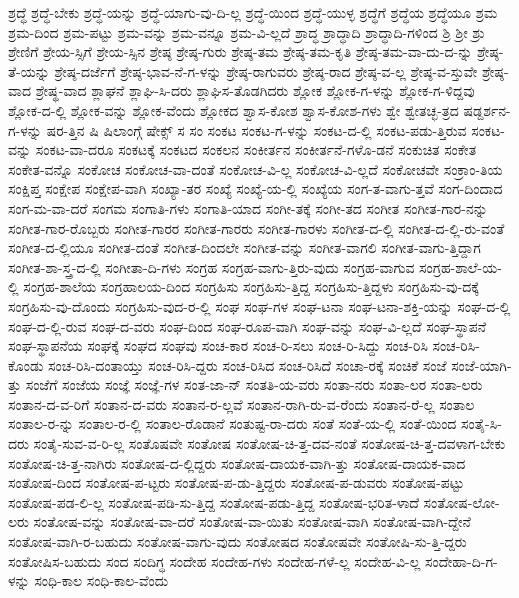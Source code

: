 {ಶ್ರದ್ಧೆ
ಶ್ರದ್ಧೆ-ಬೇಕು
ಶ್ರದ್ಧೆ-ಯನ್ನು
ಶ್ರದ್ಧೆ-ಯಾಗು-ವು-ದಿ-ಲ್ಲ
ಶ್ರದ್ಧೆ-ಯಿಂದ
ಶ್ರದ್ಧೆ-ಯುಳ್ಳ
ಶ್ರದ್ಧೆಗೆ
ಶ್ರದ್ಧೆಯ
ಶ್ರದ್ಧೆಯೂ
ಶ್ರಮ
ಶ್ರಮ-ದಿಂದ
ಶ್ರಮ-ಪಟ್ಟು
ಶ್ರಮ-ವನ್ನು
ಶ್ರಮ-ವನ್ನೂ
ಶ್ರಮ-ವಿ-ಲ್ಲದೆ
ಶ್ರಾದ್ಧ
ಶ್ರಾದ್ಧಾದಿ
ಶ್ರಾದ್ಧಾದಿ-ಗಳಿಂದ
ಶ್ರಿ
ಶ್ರೀ
ಶ್ರು
ಶ್ರೇಣಿಗೆ
ಶ್ರೇಯ-ಸ್ಸಿಗೆ
ಶ್ರೇಯ-ಸ್ಸಿನ
ಶ್ರೇಷ್ಠ
ಶ್ರೇಷ್ಠ-ಗುರು
ಶ್ರೇಷ್ಠ-ತಮ
ಶ್ರೇಷ್ಠ-ತಮ-ಕೃತಿ
ಶ್ರೇಷ್ಠ-ತಮ-ವಾ-ದು-ದ-ನ್ನು
ಶ್ರೇಷ್ಠ-ತೆ-ಯನ್ನು
ಶ್ರೇಷ್ಠ-ದರ್ಜೆಗೆ
ಶ್ರೇಷ್ಠ-ಭಾವ-ನೆ-ಗ-ಳನ್ನು
ಶ್ರೇಷ್ಠ-ರಾಗುವರು
ಶ್ರೇಷ್ಠ-ರಾದ
ಶ್ರೇಷ್ಠ-ವ-ಲ್ಲ
ಶ್ರೇಷ್ಠ-ವ-ಸ್ತುವೇ
ಶ್ರೇಷ್ಠ-ವಾದ
ಶ್ರೇಷ್ಥ-ವಾದ
ಶ್ಲಾಘನೆ
ಶ್ಲಾಘಿ-ಸಿ-ದರು
ಶ್ಲಾಘಿಸ-ತೊಡಗಿದರು
ಶ್ಲೋಕ
ಶ್ಲೋಕ-ಗ-ಳನ್ನು
ಶ್ಲೋಕ-ಗ-ಳಿದ್ದವು
ಶ್ಲೋಕ-ದ-ಲ್ಲಿ
ಶ್ಲೋಕ-ವನ್ನು
ಶ್ಲೋಕ-ವೆಂದು
ಶ್ಲೋಕದ
ಶ್ವಾಸ-ಕೋಶ
ಶ್ವಾಸ-ಕೋಶ-ಗಳು
ಶ್ವೇ
ಶ್ವೇತಚ್ಛ-ತ್ರದ
ಷಡ್ದರ್ಶನ-ಗ-ಳನ್ನು
ಷರ-ತ್ತಿನ
ಷಿ
ಷಿಲಾಂಗ್ಗೆ
ಷೇಕ್ಸ್
ಸ
ಸಂ
ಸಂಕಟ
ಸಂಕಟ-ಗ-ಳನ್ನು
ಸಂಕಟ-ದ-ಲ್ಲಿ
ಸಂಕಟ-ಪಡು-ತ್ತಿರುವ
ಸಂಕಟ-ವನ್ನು
ಸಂಕಟ-ವಾ-ದರೂ
ಸಂಕಟಕ್ಕೆ
ಸಂಕಟದ
ಸಂಕಲನ
ಸಂಕೀರ್ತನ
ಸಂಕೀರ್ತನೆ-ಗಳೊ-ಡನೆ
ಸಂಕುಚಿತ
ಸಂಕೇತ
ಸಂಕೇತ-ವನ್ನೊ
ಸಂಕೋಚ
ಸಂಕೋಚ-ವಾ-ದಂತೆ
ಸಂಕೋಚ-ವಿ-ಲ್ಲ
ಸಂಕೋಚ-ವಿ-ಲ್ಲದೆ
ಸಂಕೋಚವೇ
ಸಂಕ್ರಾಂ-ತಿಯ
ಸಂಕ್ಷಿಪ್ತ
ಸಂಕ್ಷೇಪ
ಸಂಕ್ಷೇಪ-ವಾಗಿ
ಸಂಖ್ಯಾ-ತರ
ಸಂಖ್ಯೆ
ಸಂಖ್ಯೆ-ಯ-ಲ್ಲಿ
ಸಂಖ್ಯೆಯ
ಸಂಗ-ತ-ವಾಗು-ತ್ತವೆ
ಸಂಗ-ದಿಂದಾದ
ಸಂಗ-ಮ-ವಾ-ದರೆ
ಸಂಗಮ
ಸಂಗಾತಿ-ಗಳು
ಸಂಗಾತಿ-ಯಾದ
ಸಂಗೀ-ತಕ್ಕೆ
ಸಂಗೀ-ತದ
ಸಂಗೀತ
ಸಂಗೀತ-ಗಾರ-ನನ್ನು
ಸಂಗೀತ-ಗಾರ-ರೊಬ್ಬರು
ಸಂಗೀತ-ಗಾರರ
ಸಂಗೀತ-ಗಾರರು
ಸಂಗೀತ-ಗಾರಳು
ಸಂಗೀತ-ದ-ಲ್ಲಿ
ಸಂಗೀತ-ದ-ಲ್ಲಿ-ರು-ವಂತೆ
ಸಂಗೀತ-ದ-ಲ್ಲಿಯೂ
ಸಂಗೀತ-ದಂತೆ
ಸಂಗೀತ-ದಿಂದಲೇ
ಸಂಗೀತ-ವನ್ನು
ಸಂಗೀತ-ವಾಗಲಿ
ಸಂಗೀತ-ವಾಗು-ತ್ತಿದ್ದಾಗ
ಸಂಗೀತ-ಶಾ-ಸ್ತ್ರ-ದ-ಲ್ಲಿ
ಸಂಗೀತಾ-ದಿ-ಗಳು
ಸಂಗ್ರಹ
ಸಂಗ್ರಹ-ವಾಗು-ತ್ತಿರು-ವುದು
ಸಂಗ್ರಹ-ವಾಗುವ
ಸಂಗ್ರಹ-ಶಾಲೆ-ಯ-ಲ್ಲಿ
ಸಂಗ್ರಹ-ಶಾಲೆಯ
ಸಂಗ್ರಹಾಲಯ-ದಿಂದ
ಸಂಗ್ರಹಿಸು
ಸಂಗ್ರಹಿಸು-ತ್ತಿದ್ದ
ಸಂಗ್ರಹಿಸು-ತ್ತಿದ್ದಳು
ಸಂಗ್ರಹಿಸು-ವು-ದಕ್ಕೆ
ಸಂಗ್ರಹಿಸು-ವು-ದೊಂದು
ಸಂಗ್ರಹಿಸು-ವುದ-ರ-ಲ್ಲಿ
ಸಂಘ
ಸಂಘ-ಗಳ
ಸಂಘ-ಟನಾ
ಸಂಘ-ಟನಾ-ಶಕ್ತಿ-ಯನ್ನು
ಸಂಘ-ದ-ಲ್ಲಿ
ಸಂಘ-ದ-ಲ್ಲಿ-ರುವ
ಸಂಘ-ದ-ವರು
ಸಂಘ-ದಿಂದ
ಸಂಘ-ರೂಪ-ವಾಗಿ
ಸಂಘ-ವನ್ನು
ಸಂಘ-ವಿ-ಲ್ಲದೆ
ಸಂಘ-ಸ್ಥಾಪನೆ
ಸಂಘ-ಸ್ಥಾಪನೆಯ
ಸಂಘಕ್ಕೆ
ಸಂಘದ
ಸಂಘವು
ಸಂಚ-ಕಾರ
ಸಂಚ-ರಿ-ಸಲು
ಸಂಚ-ರಿ-ಸಿದ್ದು
ಸಂಚ-ರಿಸಿ
ಸಂಚ-ರಿಸಿ-ಕೊಂಡು
ಸಂಚ-ರಿಸಿ-ದಂತಾಯ್ತು
ಸಂಚ-ರಿಸಿ-ದ್ದರು
ಸಂಚ-ರಿಸಿದ
ಸಂಚ-ರಿಸಿದೆ
ಸಂಚಾ-ರಕ್ಕೆ
ಸಂಚಿಕೆ
ಸಂಜೆ
ಸಂಜೆ-ಯಾಗಿ-ತ್ತು
ಸಂಜೆಗೆ
ಸಂಜೆಯ
ಸಂಜ್ಞೆ
ಸಂಜ್ಞೆ-ಗಳ
ಸಂತ-ಜಾ-ನ್
ಸಂತತಿ-ಯ-ವರು
ಸಂತಾ-ನರು
ಸಂತಾ-ಲರ
ಸಂತಾ-ಲರು
ಸಂತಾನ-ದ-ವ-ರಿಗೆ
ಸಂತಾನ-ದ-ವರು
ಸಂತಾನ-ರ-ಲ್ಲವೆ
ಸಂತಾನ-ರಾಗಿ-ರು-ವ-ರೆಂದು
ಸಂತಾನ-ರೆ-ಲ್ಲ
ಸಂತಾಲ
ಸಂತಾಲ-ರ-ನ್ನು
ಸಂತಾಲ-ರ-ಲ್ಲಿ
ಸಂತಾಲ-ರೊಡಾನೆ
ಸಂತುಷ್ಟ-ರಾ-ದರು
ಸಂತೆ
ಸಂತೆ-ಯ-ಲ್ಲಿ
ಸಂತೆ-ಯಿಂದ
ಸಂತೈ-ಸಿ-ದರು
ಸಂತೈ-ಸುವ-ವ-ರಿ-ಲ್ಲ
ಸಂತೊಷವೇ
ಸಂತೋಷ
ಸಂತೋಷ-ಚಿ-ತ್ತ-ದವ-ನಂತೆ
ಸಂತೋಷ-ಚಿ-ತ್ತ-ದವಳಾಗ-ಬೇಕು
ಸಂತೋಷ-ಚಿ-ತ್ತ-ನಾಗಿರು
ಸಂತೋಷ-ದ-ಲ್ಲಿದ್ದರು
ಸಂತೋಷ-ದಾಯಕ-ವಾಗಿ-ತ್ತು
ಸಂತೋಷ-ದಾಯಕ-ವಾದ
ಸಂತೋಷ-ದಿಂದ
ಸಂತೋಷ-ಪ-ಟ್ಟರು
ಸಂತೋಷ-ಪ-ಡು-ತ್ತಿದ್ದರು
ಸಂತೋಷ-ಪ-ಡುವರು
ಸಂತೋಷ-ಪಟ್ಟು
ಸಂತೋಷ-ಪಡ-ಲಿ-ಲ್ಲ
ಸಂತೋಷ-ಪಡಿ-ಸು-ತ್ತಿದ್ದ
ಸಂತೋಷ-ಪಡು-ತ್ತಿದ್ದ
ಸಂತೋಷ-ಭರಿತ-ಳಾದೆ
ಸಂತೋಷ-ಲೋ-ಲರು
ಸಂತೋಷ-ವನ್ನು
ಸಂತೋಷ-ವಾ-ದರೆ
ಸಂತೋಷ-ವಾ-ಯಿತು
ಸಂತೋಷ-ವಾಗಿ
ಸಂತೋಷ-ವಾಗಿ-ದ್ದೇನೆ
ಸಂತೋಷ-ವಾಗಿ-ರ-ಬಹುದು
ಸಂತೋಷ-ವಾಗು-ವುದು
ಸಂತೋಷದ
ಸಂತೋಷವೇ
ಸಂತೋಷಿ-ಸು-ತ್ತಿ-ದ್ದರು
ಸಂತೋಷಿಸ-ಬಹುದು
ಸಂದ
ಸಂದಿಗ್ಧ
ಸಂದೇಹ
ಸಂದೇಹ-ಗಳು
ಸಂದೇಹ-ಗಳೆ-ಲ್ಲ
ಸಂದೇಹ-ವಿ-ಲ್ಲ
ಸಂದೇಹಾ-ದಿ-ಗ-ಳನ್ನು
ಸಂಧಿ-ಕಾಲ
ಸಂಧಿ-ಕಾಲ-ವೆಂದು
}
